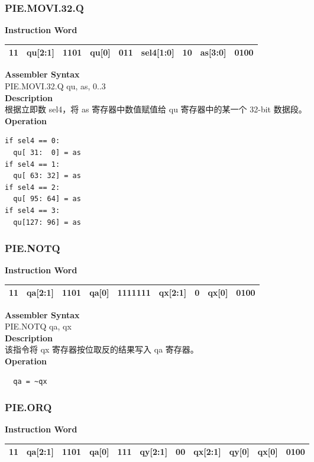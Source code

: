 \newpage
\subsubsection{PIE.MOVI.32.Q}\label{instruction:PIEMOVI32Q}
\setlength\tabcolsep{6pt}
\textbf{Instruction Word} \\
\begin{tabular}{|c|c|c|c|c|c|c|c|c|}
	\hline
	11 & qu[2:1] & 1101 & qu[0] & 011 & sel4[1:0] & 10 & as[3:0] & 0100 \\
	\hline
\end{tabular}

\textbf{Assembler Syntax} \\
PIE.MOVI.32.Q qu, as, 0..3 \\
\textbf{Description} \\
根据立即数 sel4，将 as 寄存器中数值赋值给 qu 寄存器中的某一个 32-bit 数据段。\\
\textbf{Operation}
\begin{lstlisting}
if sel4 == 0:
  qu[ 31:  0] = as
if sel4 == 1:
  qu[ 63: 32] = as
if sel4 == 2:
  qu[ 95: 64] = as
if sel4 == 3:
  qu[127: 96] = as
\end{lstlisting}

\newpage
\subsubsection{PIE.NOTQ}\label{instruction:PIENOTQ}
\setlength\tabcolsep{6pt}
\textbf{Instruction Word} \\
\begin{tabular}{|c|c|c|c|c|c|c|c|c|}
	\hline
	11 & qa[2:1] & 1101 & qa[0] & 1111111 & qx[2:1] & 0 & qx[0] & 0100 \\
	\hline
\end{tabular}

\textbf{Assembler Syntax} \\
PIE.NOTQ qa, qx \\
\textbf{Description} \\
该指令将 qx 寄存器按位取反的结果写入 qa 寄存器。\\
\textbf{Operation}
\begin{lstlisting}
  qa = ~qx
\end{lstlisting}

\newpage
\subsubsection{PIE.ORQ}\label{instruction:PIEORQ}
\setlength\tabcolsep{6pt}
\textbf{Instruction Word} \\
\begin{tabular}{|c|c|c|c|c|c|c|c|c|c|c|}
	\hline
	11 & qa[2:1] & 1101 & qa[0] & 111 & qy[2:1] & 00 & qx[2:1] & qy[0] & qx[0] & 0100 \\
	\hline
\end{tabular}

